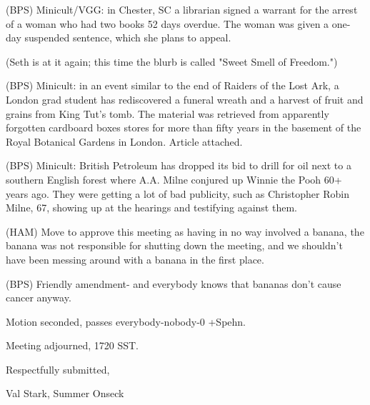 \documentclass[12pt]{article}
\begin{document}
(BPS) Minicult/VGG: in Chester, SC a librarian signed a warrant for the arrest of a woman who had two books 52 days overdue. The woman was given a one-day suspended sentence, which she plans to appeal.

(Seth is at it again; this time the blurb is called "Sweet Smell of Freedom.")

(BPS) Minicult: in an event similar to the end of Raiders of the Lost Ark, a London grad student has rediscovered a funeral wreath and a harvest of fruit and grains from King Tut's tomb. The material was retrieved from apparently forgotten cardboard boxes stores for more than fifty years in the basement of the Royal Botanical Gardens in London. Article attached.

(BPS) Minicult: British Petroleum has dropped its bid to drill for oil next to a southern English forest where A.A. Milne conjured up Winnie the Pooh 60+ years ago. They were getting a lot of bad publicity, such as Christopher Robin Milne, 67, showing up at the hearings and testifying against them.

(HAM) Move to approve this meeting as having in no way involved a banana, the banana was not responsible for shutting down the meeting, and we shouldn't have been messing around with a banana in the first place.

(BPS) Friendly amendment- and everybody knows that bananas don't cause cancer anyway.

Motion seconded, passes everybody-nobody-0 +Spehn.

\vspace{12pt}

\noindent
Meeting adjourned, 1720 SST.

\vspace{18pt}

\centerline{Respectfully submitted,}
\centerline{Val Stark, Summer Onseck}
\end{document}
